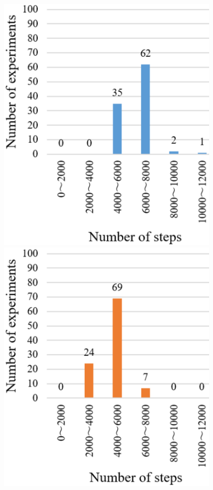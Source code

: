 \documentclass{jarticle}
\begin{document}
\begin{figure}[htbp]
  \begin{minipage}[t]{0.5\linewidth}
    \centering
    \includegraphics[keepaspectratio, scale=0.27]{./pdf/c.pdf}
  \end{minipage}
  \begin{minipage}[t]{0.5\linewidth}
    \centering
    \includegraphics[keepaspectratio, scale=0.273]{./pdf/p.pdf}

\end{minipage}
\end{figure}
\end{document}
